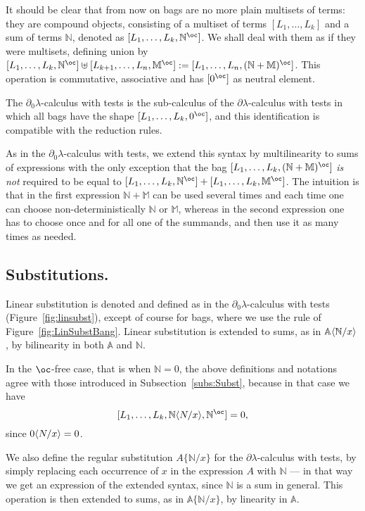 \documentclass{LMCS}
\newcommand{\dlam}{\ensuremath{\partial\lambda}}
\newcommand{\dzlam}{\ensuremath{\partial_0\lambda}}
\newcommand{\bang}{\oc}
\newcommand{\subst}[2]{\{ #2 / #1 \}}	\newcommand{\dg}[2]{\mathrm{deg}_{#1}(#2)} \newcommand{\obsle}{\sqsubseteq_{\mathcal{O}}}
\newcommand{\mcup}{\uplus}
\newcommand{\ass}{:=}
\newcommand{\sA}{\mathbb{A}}
\newcommand{\sM}{\mathbb{M}}
\newcommand{\sN}{\mathbb{N}}
\begin{document}
It should be clear that from now on bags are no more plain multisets
of terms: they are compound objects, consisting of a multiset of terms
$[L_1,\ldots,L_k]$ and a sum of terms $\sN$, denoted as 
$[L_1,\ldots,L_k,\sN^\bang]$. 
We shall deal with them as if they were multisets, defining union by 
 $[L_1,\ldots,L_k,\sN^\bang]\mcup [L_{k+1},\ldots,L_n,\sM^\bang]\ass
[L_1,\ldots,L_n,(\sN+\sM)^\bang]$. This operation is commutative,
associative and has $[0^\bang]$ as neutral element.

\begin{rem}
The \dzlam-calculus with tests is the sub-calculus of the \dlam-calculus with tests in which all bags have the shape $[L_1,\ldots,L_k,0^\bang]$, and this
 identification is compatible with the reduction rules.
\end{rem}

As in the  \dzlam-calculus with tests, we extend this syntax by multilinearity to sums of 
 expressions with the only exception that the bag $[L_1,\ldots,L_k,(\sN+\sM)^\bang]$ {\em is not} required to be equal to 
 $[L_1,\ldots,L_k,\sN^\bang]+ [L_1,\ldots,L_k,\sM^\bang]$. The intuition is that in the first expression $\sN+\sM$ can be used
 several times and each time one can choose non-deterministically $\sN$ or $\sM$, whereas in the second expression one has to choose once and for all 
 one of the summands, and then use it as many times as needed.

\subsection{Substitutions.}
Linear substitution is denoted and defined as in the \dzlam-calculus with tests (Figure~\ref{fig:linsubst}), except of course for bags, 
where we use the rule of Figure~\ref{fig:LinSubstBang}.
Linear substitution is extended to sums, as in $\sA\lsubst{x}{\sN}$, by bilinearity in both $\sA$ and $\sN$.

\begin{rem}
In the $\bang$-free case, that is when $\sN=0$, the above definitions and notations agree with those introduced in Subsection~\ref{subs:Subst},
because in that case we have 
$$[L_1,\ldots,L_k,\sN\lsubst{x}{N},\sN^\bang]=0,$$ 
since $0\lsubst{x}{N}=0$.
\end{rem}


We also define the regular substitution $A\subst{x}{\sN}$ 
for the \dlam-calculus with tests, by simply replacing each occurrence of 
$x$ in the expression $A$ with $\sN$ --- in that way we get an expression of the extended
syntax, since $\sN$ is a sum in general. 
This operation is then extended to sums, as in $\sA\subst{x}{\sN}$, by linearity in $\sA$.
\end{document}
